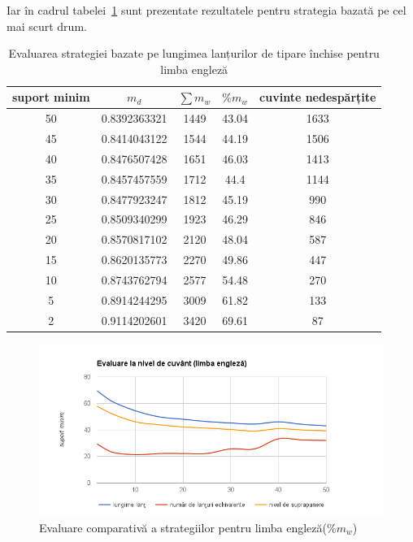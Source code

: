 Iar în cadrul tabelei~\ref{table:shortest_en} sunt prezentate rezultatele pentru strategia bazată pe cel mai scurt drum. 

\begin{table}[h!]
\centering
\begin{tabular}{|c|c|c|c|c|}
\hline
suport minim & $m_d$ & $\sum m_w$ & $\%{m_w}$ & cuvinte nedespărțite\\  
\hline
\hline
50	& 0.8392363321 &	1449 &	43.04 &	1633 \\
\hline
45 & 0.8414043122 &	1544 &	44.19 &	1506 \\
\hline
40 &	0.8476507428 &	1651 &	46.03 &	1413 \\
\hline
35 &	0.8457457559 &	1712 &	44.4 &	1144 \\
\hline
30 & 0.8477923247 &	1812 &	45.19 &	990 \\
\hline
25 &	0.8509340299 &	1923 &	46.29 &	846 \\
\hline
20 &	0.8570817102 &	2120 &	48.04 &	587 \\
\hline
15 &	0.8620135773 &	2270 &	49.86 &	447 \\
\hline
10 &	0.8743762794 &	2577 &	54.48 &	270 \\
\hline
5 &	0.8914244295 &	3009 &	61.82 &	133 \\
\hline
2 &	0.9114202601 &	3420 &	69.61 &	87 \\
\hline\end{tabular}
\caption{Evaluarea strategiei bazate pe lungimea lanțurilor de tipare închise pentru limba engleză} 
\label{table:shortest_en}
\end{table}

\begin{figure}[h!]
    \centering
    \includegraphics[width=1\textwidth]{figures/strategies-word-en.png}
    \caption{Evaluare comparativă a strategiilor pentru limba engleză($\%m_w$)}
    \label{fig:strategies-word-en}
\end{figure}

